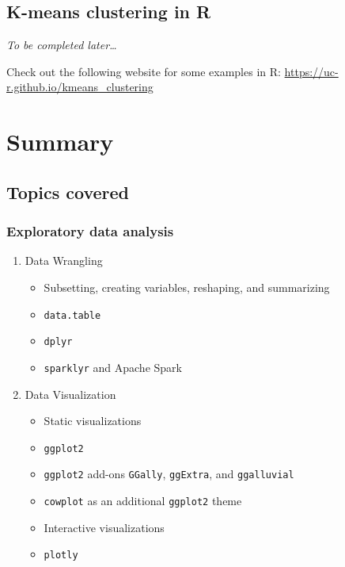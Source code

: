 \documentclass[]{book}
\providecommand{\tightlist}{%
  \setlength{\itemsep}{0pt}\setlength{\parskip}{0pt}}
\begin{document}
\hypertarget{k-means-clustering-in-r}{%
\section{K-means clustering in R}\label{k-means-clustering-in-r}}

\emph{To be completed later\ldots{}}

Check out the following website for some examples in R: \url{https://uc-r.github.io/kmeans_clustering}

\hypertarget{summary-1}{%
\chapter{Summary}\label{summary-1}}

\hypertarget{topics-covered}{%
\section{Topics covered}\label{topics-covered}}

\hypertarget{exploratory-data-analysis}{%
\subsection{Exploratory data analysis}\label{exploratory-data-analysis}}

\begin{enumerate}
\def\labelenumi{\arabic{enumi}.}
\tightlist
\item
  Data Wrangling

  \begin{itemize}
  \tightlist
  \item
    Subsetting, creating variables, reshaping, and summarizing
  \item
    \texttt{data.table}
  \item
    \texttt{dplyr}
  \item
    \texttt{sparklyr} and Apache Spark
  \end{itemize}
\item
  Data Visualization

  \begin{itemize}
  \tightlist
  \item
    Static visualizations
  \item
    \texttt{ggplot2}
  \item
    \texttt{ggplot2} add-ons \texttt{GGally}, \texttt{ggExtra}, and \texttt{ggalluvial}
  \item
    \texttt{cowplot} as an additional \texttt{ggplot2} theme
  \item
    Interactive visualizations
  \item
    \texttt{plotly}
  \end{itemize}
\end{enumerate}
\end{document}

